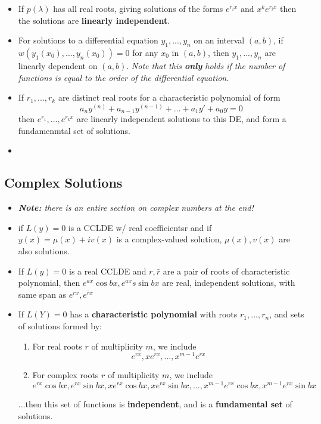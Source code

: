 \documentclass[10pt,letterpaper]{article}
\begin{document}
\begin{itemize}
\item If $p(\lambda)$ has all real roots, giving solutions of the forms $e^{r_ix}\mbox{ and }x^ke^{r_ix}$
then the solutions are \textbf{linearly independent}.

\item For solutions to a differential equation $y_1,...,y_n$ on an interval $(a,b)$, if $w(y_1(x_0),...,y_n(x_0))=0$ for any $x_0$ in $(a,b)$, then $y_1,...,y_n$ are linearly dependent on $(a,b)$. \textit{Note that this \textbf{only} holds if the number of functions is equal to the order of the differential equation.}

\item If $r_1,...,r_k$ are distinct real roots for a characteristic polynomial of form 
$$a_ny^{(n)}+a_{n-1}y^{(n-1)}+...+a_1y'+a_0y=0$$
then $e^{r_1},...,e^{r_kx}$ are linearly independent solutions to this DE, and form a fundamenmtal set of solutions. 

\item 

\end{itemize}


\subsection*{Complex Solutions}
\begin{itemize}

\item \textit{\textbf{Note: }there is an entire section on complex numbers at the end!}

\item if $L(y)=0$ is a CCLDE w/ real coefficientsr and if $y(x) = \mu(x) + iv(x)$ is a complex-valued solution, $\mu(x), v(x)$ are also solutions. 

\item If $L(y)=0$ is a real CCLDE and $r, \bar{r}$ are a pair of roots of characteristic polynomial, then 
$e^{ax}\cos bx, e^{ax}s\sin bx$ are real, independent solutions, with same span as $e^{rx}, e^{\bar{r}x}$

\item If $L(Y)=0$ has a \textbf{characteristic polynomial} with roots $r_1, ...,r_n$, and sets of solutions formed by: 
\begin{enumerate}
\item For real roots $r$ of multiplicity $m$, we include 
$$e^{rx}, xe^{rx}, ..., x^{m-1}e^{rx}$$
\item For complex roots $r$ of multiplicity $m$, we include
 $$e^{rx}\cos bx, e^{rx}\sin bx, xe^{rx}\cos bx, xe^{rx}\sin bx , ..., x^{m-1}e^{rx}\cos bx, x^{m-1}e^{rx}\sin bx$$
\end{enumerate}
...then this set of functions is \textbf{independent}, and is a \textbf{fundamental set }of solutions. 


\end{itemize}
\end{document}
